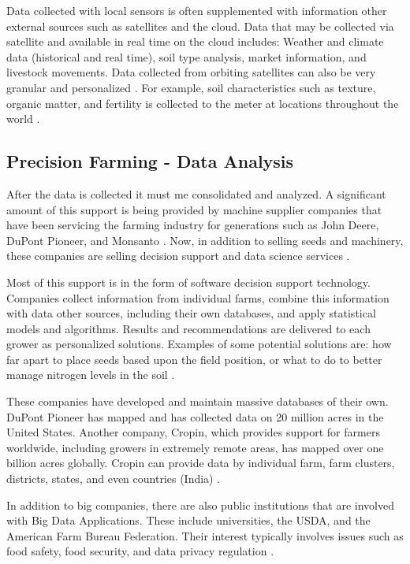 \documentclass[sigconf]{acmart}
\begin{document}
Data collected with local sensors is often supplemented with information other external sources such as satellites and the cloud.  Data that may be collected via satellite and available in real time on the cloud includes: Weather and climate data (historical and real time), soil type analysis, market information, and livestock movements.  Data collected from orbiting satellites can also be very granular and personalized \cite{DevEcon}. For example, soil characteristics such as texture, organic matter, and fertility is collected to the meter at locations throughout the world \cite{DevEcon}. 

\subsection{Precision Farming - Data Analysis}

After the data is collected it must me consolidated and analyzed.  A significant amount of this support is being provided by machine supplier companies that have been servicing the farming industry for generations such as John Deere, DuPont Pioneer, and Monsanto \cite{www-google-Crop}.  Now, in addition to selling seeds and machinery, these companies are selling decision support and data science services \cite{www-google-Farm}.

Most of this support is in the form of software decision support technology.  Companies collect information from individual farms, combine this information with data other sources, including their own databases, and apply statistical  models and algorithms.  Results and recommendations are delivered to each grower as personalized solutions.  Examples of some potential solutions are: how far apart to place seeds based upon the field position, or what to do to better manage nitrogen levels in the soil \cite{www-google-Crop}. 

These companies have developed and maintain massive databases of their own.  DuPont Pioneer has mapped and has collected data on 20 million acres in the United States. Another company, Cropin, which provides support for farmers worldwide, including growers in extremely remote areas, has mapped over one billion acres globally. Cropin can provide data by individual farm, farm clusters, districts, states, and even countries (India) \cite {www-google-Crop}.

In addition to big companies, there are also public institutions that are involved with Big Data Applications. These include universities, the USDA, and the American Farm Bureau Federation.  Their interest typically involves issues such as food safety, food security, and data privacy regulation \cite{Wolfert}. 
\end{document}

